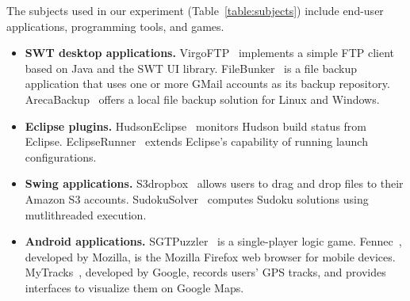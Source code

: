 The subjects used in our experiment (Table~\ref{table:subjects})
include end-user applications, programming tools, and games. 

\vspace{-5pt}

\begin{itemize}%
\item \textbf{SWT desktop applications.}
VirgoFTP~\cite{virgo} implements a simple FTP client based on Java and the SWT UI library.
FileBunker~\cite{filebunker} is a file backup application that uses one or more GMail
accounts as its backup repository. ArecaBackup~\cite{areca} offers a local
file backup solution for Linux and Windows.


\item \textbf{Eclipse plugins.}
HudsonEclipse~\cite{hudson} monitors Hudson build status from Eclipse.
EclipseRunner~\cite{eclipserunner} extends Eclipse's capability of running launch configurations.


\item \textbf{Swing applications.} %
S3dropbox~\cite{s3dropbox}  allows users
to drag and drop files to their Amazon S3 accounts. SudokuSolver~\cite{sudokusolver}
computes Sudoku solutions using mutlithreaded execution. 


\item  \textbf{Android applications.} %
SGTPuzzler~\cite{sgtpuzzles} is a single-player logic game.
Fennec~\cite{fennec}, developed by Mozilla, is the Mozilla
Firefox web browser for mobile devices. 
MyTracks~\cite{mytracks}, developed by Google, records users' GPS tracks, and provides
interfaces to visualize them on Google Maps. 

\end{itemize}


